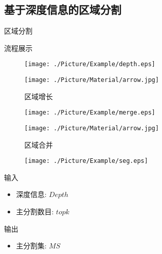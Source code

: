 \documentclass[xcolor=table,notheorems,compress,blue]{beamer}
\begin{document}
  \subsection{基于深度信息的区域分割}
	\begin{frame}{区域分割}
		\begin{exampleblock}{流程展示}
			\begin{figure}[htpb]
				\centering
				\begin{minipage}[b]{0.8in}
					\centerline{ \texttt{[image: ./Picture/Example/depth.eps]} }
				\end{minipage}
				\begin{minipage}[b]{0.8in}
					\centerline{ \texttt{[image: ./Picture/Material/arrow.jpg]} }
					\centerline{\tiny{区域增长}}
				\end{minipage}
				\begin{minipage}[b]{0.8in}
					\centerline{ \texttt{[image: ./Picture/Example/merge.eps]} }
				\end{minipage}
				\begin{minipage}[b]{0.8in}
					\centerline{ \texttt{[image: ./Picture/Material/arrow.jpg]} }
					\centerline{\tiny{区域合并}}
				\end{minipage}
				\begin{minipage}[b]{0.8in}
					\centerline{ \texttt{[image: ./Picture/Example/seg.eps]} }
				\end{minipage}
			\end{figure}
		\end{exampleblock}
		\begin{exampleblock}{输入}
			\begin{itemize}		
				\item  深度信息: $Depth$
				\item  主分割数目: ${topk}$
			\end{itemize}
		\end{exampleblock}
		\begin{exampleblock}{输出}
			\begin{itemize}		
				\item  主分割集: ${MS}$
			\end{itemize}
		\end{exampleblock}
	\end{frame}
	
\end{document}
